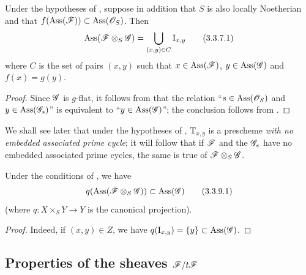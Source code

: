 \begin{corollary}[3.3.7]
\label{IV.3.3.7}
Under the hypotheses of , suppose in addition that $S$ is also locally Noetherian and that $f(\operatorname{Ass}(\mathscr{F}))\subset\operatorname{Ass}(\mathscr{O}_S)$.
Then
\[
\label{IV.3.3.7.1}
\operatorname{Ass}(\mathscr{F}\otimes_S\mathscr{G})=\bigcup_{(x,y)\in C}\mathrm{I}_{x,y}
\tag{3.3.7.1}
\]
where $C$ is the set of pairs $(x,y)$ such that $x\in\operatorname{Ass}(\mathscr{F})$, $y\in\operatorname{Ass}(\mathscr{G})$ and $f(x)=g(y)$.
\end{corollary}

\begin{proof}
Since $\mathscr{G}$ is $g$-flat, it follows from  that the relation
``$s\in\operatorname{Ass}(\mathscr{O}_S)$ and $y\in\operatorname{Ass}(\mathscr{G}_s)$''
is equivalent to ``$y\in\operatorname{Ass}(\mathscr{G})$''; the conclusion follows from .
\end{proof}

\begin{remarks}[3.3.8]
\label{IV.3.3.8}
We shall see later  that under the hypotheses of , $\mathrm{T}_{x,y}$ is a prescheme \emph{with no embedded associated prime cycle}; it will follow that if $\mathscr{F}$ and the $\mathscr{G}_s$ have no embedded associated prime cycles, the same is true of $\mathscr{F}\otimes_S\mathscr{G}$.
\end{remarks}

\begin{corollary}[3.3.9]
\label{IV.3.3.9}
Under the conditions of , we have
\[
\label{IV.3.3.9.1}
q(\operatorname{Ass}(\mathscr{F}\otimes_S\mathscr{G}))\subset\operatorname{Ass}(\mathscr{G})
\tag{3.3.9.1}
\]
(where $q:X\times_S Y\to Y$ is the canonical projection).
\end{corollary}

\begin{proof}
Indeed, if $(x,y)\in Z$, we have $q(\mathrm{I}_{x,y})=\{y\}\subset\operatorname{Ass}(\mathscr{G})$.
\end{proof}


\subsection{Properties of the sheaves \texorpdfstring{$\mathscr{F}/t\mathscr{F}$}{F/tF}}
\label{subsection:IV.3.4}
\label{IV.3.4}


